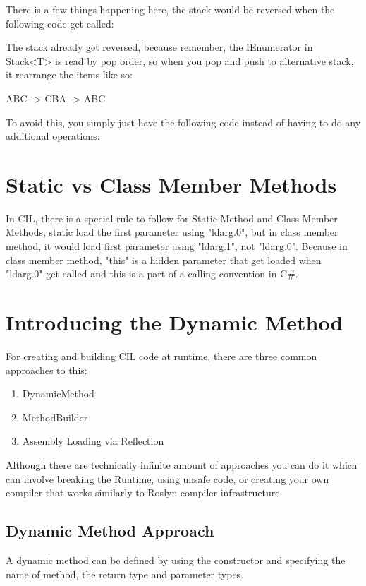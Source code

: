

There is a few things happening here, the stack would be reversed when the following code get called:



The stack already get reversed, because remember, the IEnumerator in Stack<T> is read by pop order, so when you pop and push to alternative stack, it rearrange the items like so:

ABC -> CBA -> ABC

To avoid this, you simply just have the following code instead of having to do any additional operations:



\newpage
\section{Static vs Class Member Methods}
In CIL, there is a special rule to follow for Static Method and Class Member Methods, static load the first parameter using "ldarg.0", but in class member method, it would load first parameter using "ldarg.1", not "ldarg.0". Because in class member method, "this" is a hidden parameter that get loaded when "ldarg.0" get called and this is a part of a calling convention in C\#.



\newpage

\section{Introducing the Dynamic Method}
For creating and building CIL code at runtime, there are three common approaches to this:
\begin{enumerate}
\item DynamicMethod
\item MethodBuilder
\item Assembly Loading via Reflection
\end{enumerate}

Although there are technically infinite amount of approaches you can do it which can involve breaking the Runtime, using unsafe code, or creating your own compiler that works similarly to Roslyn compiler infrastructure.

\subsection{Dynamic Method Approach}
A dynamic method can be defined by using the constructor and specifying the name of method, the return type and parameter types.

